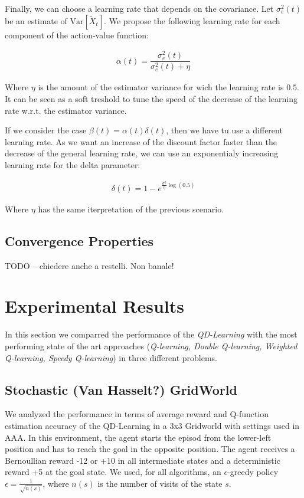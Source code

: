 \documentclass[conference]{IEEEtran}
\begin{document}
Finally, we can choose a learning rate that depends on the covariance. Let $\sigma_e^2(t)$ be an estimate of $\mathrm{Var}\left[\widetilde{X}_{t}\right]$. We propose the following learning rate for each component of the action-value function:

\begin{align}
 \alpha(t)=\dfrac{\sigma_e^2(t)}{\sigma_e^2(t)+\eta}
\end{align}

Where $\eta$ is the amount of the estimator variance for wich the learning rate is $0.5$. It can be seen as a soft treshold to tune the speed of the decrease of the learning rate w.r.t. the estimator variance.

If we consider the case $\beta(t)=\alpha(t)\delta(t)$, then we have tu use a different learning rate. As we want an increase of the discount factor faster than the decrease of the general learning rate, we can use an exponentialy increasing learning rate for the delta parameter:

\begin{align}
 \delta(t) = 1- e^{\frac{\sigma^2}{\eta}\log(0.5)}
\end{align}

Where $\eta$ has the same iterpretation of the previous scenario.


\subsection{Convergence Properties}

TODO -- chiedere anche a restelli. Non banale!


\section{Experimental Results}
In this section we comparred the performance of the \emph{QD-Learning} with the most performing state of the art approaches (\emph{Q-learning,  Double Q-learning, Weighted Q-learning, Speedy Q-learning}) in three different problems.
\subsection{Stochastic (Van Hasselt?) GridWorld}
We analyzed the performance in terms of average reward and Q-function estimation accuracy of the QD-Learning in a $3$x$3$ Gridworld with settings used in AAA. In this environment, the agent starts the episod from the lower-left position and has to reach the goal in the opposite position. The agent receives a Bernoullian reward -12 or +10 in all intermediate states and a deterministic reward +5 at the goal state. We used, for all algorithms, an	$\epsilon$-greedy policy $\epsilon = \frac{1}{\sqrt{n(s)}}$, where $n(s)$ is the number of  visits of the state $s$.
\end{document}
